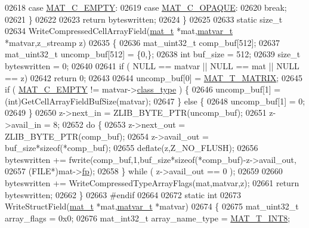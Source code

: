 \begin{DoxyCode}
{{{{{{{{{{{{{{{{02618         \textcolor{keywordflow}{case} \hyperlink{group___m_a_t_ggad4d60ae7b709fc81bfd744fb4c857c40a5c76eef0ca0373d25abe49053be6fa9a}{MAT\_C\_EMPTY}:
02619         \textcolor{keywordflow}{case} \hyperlink{group___m_a_t_ggad4d60ae7b709fc81bfd744fb4c857c40ad83c684d250e463c1a3779647695c0c9}{MAT\_C\_OPAQUE}:
02620             \textcolor{keywordflow}{break};
02621     \}
02622 
02623     \textcolor{keywordflow}{return} byteswritten;
02624 \}
02625 
02633 \textcolor{keyword}{static} \textcolor{keywordtype}{size\_t}
02634 WriteCompressedCellArrayField(\hyperlink{struct__mat__t}{mat\_t} *mat,\hyperlink{group___m_a_t_structmatvar__t}{matvar\_t} *matvar,z\_streamp z)
02635 \{
02636     mat\_uint32\_t comp\_buf[512];
02637     mat\_uint32\_t uncomp\_buf[512] = \{0,\};
02638     \textcolor{keywordtype}{int} buf\_size = 512;
02639     \textcolor{keywordtype}{size\_t} byteswritten = 0;
02640 
02641     \textcolor{keywordflow}{if} ( NULL == matvar || NULL == mat || NULL == z)
02642         \textcolor{keywordflow}{return} 0;
02643 
02644     uncomp\_buf[0] = \hyperlink{group___m_a_t_ggacf7b3b879282b7ab3a51190e49bf3453a32985fee89a4df8db4b3f5d3a48823d3}{MAT\_T\_MATRIX};
02645     \textcolor{keywordflow}{if} ( \hyperlink{group___m_a_t_ggad4d60ae7b709fc81bfd744fb4c857c40a5c76eef0ca0373d25abe49053be6fa9a}{MAT\_C\_EMPTY} != matvar->\hyperlink{group___m_a_t_aff13035bf3265dd7d9425e5d40c839d4}{class\_type} ) \{
02646         uncomp\_buf[1] = (int)GetCellArrayFieldBufSize(matvar);
02647     \} \textcolor{keywordflow}{else} \{
02648         uncomp\_buf[1] = 0;
02649     \}
02650     z->next\_in  = ZLIB\_BYTE\_PTR(uncomp\_buf);
02651     z->avail\_in = 8;
02652     \textcolor{keywordflow}{do} \{
02653         z->next\_out  = ZLIB\_BYTE\_PTR(comp\_buf);
02654         z->avail\_out = buf\_size*\textcolor{keyword}{sizeof}(*comp\_buf);
02655         deflate(z,Z\_NO\_FLUSH);
02656         byteswritten += fwrite(comp\_buf,1,buf\_size*\textcolor{keyword}{sizeof}(*comp\_buf)-z->avail\_out,
02657             (FILE*)mat->\hyperlink{struct__mat__t_a85f562e407ca9ad4d2a6e14f839432b7}{fp});
02658     \} \textcolor{keywordflow}{while} ( z->avail\_out == 0 );
02659 
02660     byteswritten += WriteCompressedTypeArrayFlags(mat,matvar,z);
02661     \textcolor{keywordflow}{return} byteswritten;
02662 \}
02663 \textcolor{preprocessor}{#endif}
02664 
02672 \textcolor{keyword}{static} \textcolor{keywordtype}{int}
02673 WriteStructField(\hyperlink{struct__mat__t}{mat\_t} *mat,\hyperlink{group___m_a_t_structmatvar__t}{matvar\_t} *matvar)
02674 \{
02675     mat\_uint32\_t array\_flags = 0x0;
02676     mat\_int32\_t  array\_name\_type = \hyperlink{group___m_a_t_ggacf7b3b879282b7ab3a51190e49bf3453a9807f5033ed4f9b548953742d9fd1658}{MAT\_T\_INT8};
}}}}}}}}}}}}}}}}
\end{DoxyCode}
